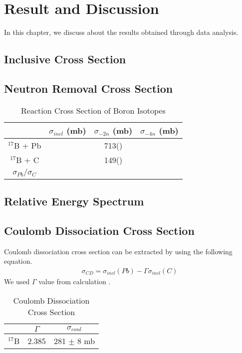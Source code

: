 \chapter{Result and Discussion}
In this chapter, we discuss about the results obtained through data analysis.
\section{Inclusive Cross Section}

\section{Neutron Removal Cross Section}
\begin{table}[h]
\centering
\begin{tabular}{c|c|c|c}
    \hline
    & $\sigma_{incl}$ (mb) & $\sigma_{-2n}$ (mb) & $\sigma_{-4n}$ (mb) \\
    \hline \hline
    $^{17}$B + Pb&  & 713() &    \\ 
    $^{17}$B + C &  & 149() &   \\ 
    $\sigma_{Pb}/\sigma_{C}$ &  &  &    \\ \hline
\end{tabular}
\caption{Reaction Cross Section of Boron Isotopes}
\label{tab:Reaction Cross Section of Boron Isotopes}

\end{table}

\section{Relative Energy Spectrum}

\section{Coulomb Dissociation Cross Section}
Coulomb dissociation cross section can be extracted by using the following equation.
\begin{align}
\sigma_{CD} = \sigma_{incl}(Pb) - \Gamma \sigma_{incl}(C)
\end{align}
We used $\Gamma$ value from calculation . 

\begin{table}[h]
\centering
    \begin{tabular}{c|c|c}
        \hline
        & $\Gamma$ & $\sigma_{coul}$   \\
        \hline
        $^{17}$B& 2.385 &   281 $\pm$ 8 mb \\ 
        \hline
    \end{tabular}
\caption{Coulomb Dissociation Cross Section}
\label{Coulomb Dissociation Cross Section}
\end{table}

